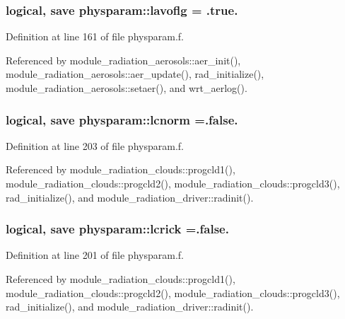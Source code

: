 \subsubsection[{\texorpdfstring{lavoflg}{lavoflg}}]{\setlength{\rightskip}{0pt plus 5cm}logical, save physparam\+::lavoflg = .true.}\hypertarget{namespacephysparam_a70a2b7af2c7f6f631ef05cb05ba6eb8c}{}\label{namespacephysparam_a70a2b7af2c7f6f631ef05cb05ba6eb8c}


Definition at line 161 of file physparam.\+f.



Referenced by module\+\_\+radiation\+\_\+aerosols\+::aer\+\_\+init(), module\+\_\+radiation\+\_\+aerosols\+::aer\+\_\+update(), rad\+\_\+initialize(), module\+\_\+radiation\+\_\+aerosols\+::setaer(), and wrt\+\_\+aerlog().

\subsubsection[{\texorpdfstring{lcnorm}{lcnorm}}]{\setlength{\rightskip}{0pt plus 5cm}logical, save physparam\+::lcnorm =.false.}\hypertarget{namespacephysparam_ae5b7bb287e8a1f935cf135ffeaadca7a}{}\label{namespacephysparam_ae5b7bb287e8a1f935cf135ffeaadca7a}


Definition at line 203 of file physparam.\+f.



Referenced by module\+\_\+radiation\+\_\+clouds\+::progcld1(), module\+\_\+radiation\+\_\+clouds\+::progcld2(), module\+\_\+radiation\+\_\+clouds\+::progcld3(), rad\+\_\+initialize(), and module\+\_\+radiation\+\_\+driver\+::radinit().

\subsubsection[{\texorpdfstring{lcrick}{lcrick}}]{\setlength{\rightskip}{0pt plus 5cm}logical, save physparam\+::lcrick =.false.}\hypertarget{namespacephysparam_a3506e1f83500ea78568ab697f55cadb4}{}\label{namespacephysparam_a3506e1f83500ea78568ab697f55cadb4}


Definition at line 201 of file physparam.\+f.



Referenced by module\+\_\+radiation\+\_\+clouds\+::progcld1(), module\+\_\+radiation\+\_\+clouds\+::progcld2(), module\+\_\+radiation\+\_\+clouds\+::progcld3(), rad\+\_\+initialize(), and module\+\_\+radiation\+\_\+driver\+::radinit().

